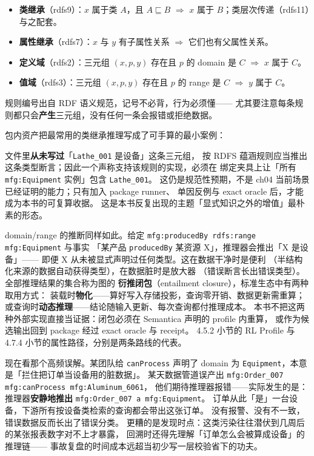 \begin{itemize}
  \item \textbf{类继承}（rdfs9）：\(x\) 属于类 \(A\)，且 \(A \sqsubseteq B\)
        \(\Rightarrow\) \(x\) 属于 \(B\)；类层次传递（rdfs11）与之配套。
  \item \textbf{属性继承}（rdfs7）：\(x\) 与 \(y\) 有子属性关系
        \(\Rightarrow\) 它们也有父属性关系。
  \item \textbf{定义域}（rdfs2）：三元组 \((x, p, y)\) 存在且 \(p\) 的
        domain 是 \(C\) \(\Rightarrow\) \(x\) 属于 \(C\)。
  \item \textbf{值域}（rdfs3）：三元组 \((x, p, y)\) 存在且 \(p\) 的
        range 是 \(C\) \(\Rightarrow\) \(y\) 属于 \(C\)。
\end{itemize}

规则编号出自 RDF 语义规范，记号不必背，行为必须懂——
尤其要注意每条规则都只会\textbf{产生}三元组，没有任何一条会报错或拒绝数据。

包内资产把最常用的类继承推理写成了可手算的最小案例：



文件里\textbf{从未写过}「\texttt{Lathe\_001} 是设备」这条三元组，
按 RDFS 蕴涵规则应当推出这条类型断言；因此一个声称支持该规则的实现，必须在
绑定夹具上让「所有 \texttt{mfg:Equipment} 实例」包含 \texttt{Lathe\_001}。
这仍是规范性预期，不是 ch04 当前场景已经证明的能力；只有加入 package runner、
单因反例与 exact oracle 后，才能成为本书的可复算收据。
这是本书反复出现的主题「显式知识之外的增值」最朴素的形态。

domain/range 的推断同样如此。给定
\texttt{mfg:producedBy rdfs:range mfg:Equipment} 与事实
「某产品 \texttt{producedBy} 某资源 X」，推理器会推出「X 是设备」——
即便 X 从未被显式声明过任何类型。这在数据干净时是便利
（半结构化来源的数据自动获得类型），在数据脏时是放大器
（错误断言长出错误类型）。全部推理结果的集合称为图的
\textbf{衍推闭包}（entailment closure），标准生态中有两种取用方式：
装载时\textbf{物化}——算好写入存储投影，查询零开销、数据更新需重算；
或查询时\textbf{动态推理}——结论随输入更新、每次查询都付推理成本。
本书不把这两种外部实现直接当证据：闭包必须在 Semantica 声明的 profile 内重算，
或作为候选输出回到 package 经过 exact oracle 与 receipt。
4.5.2 小节的 RL Profile 与 4.7.4 小节的属性路径，分别是两条路线的代表。

现在看那个高频误解。某团队给 \texttt{canProcess} 声明了
domain 为 \texttt{Equipment}，本意是「拦住把订单当设备用的脏数据」。
某天数据管道误产出 \texttt{mfg:Order\_007 mfg:canProcess mfg:Aluminum\_6061}，
他们期待推理器报错——实际发生的是：推理器\textbf{安静地推出}
\texttt{mfg:Order\_007 a mfg:Equipment}。
订单从此「是」一台设备，下游所有按设备类检索的查询都会带出这张订单。
没有报警、没有不一致，错误数据反而长出了错误分类。
更糟的是发现时点：这类污染往往潜伏到几周后的某张报表数字对不上才暴露，
回溯时还得先理解「订单怎么会被算成设备」的推理链——
事故复盘的时间成本远超当初少写一层校验省下的功夫。

